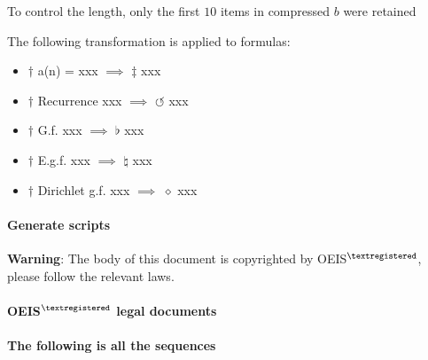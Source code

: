\documentclass{oeiscommon}
\begin{document}
To control the length, only the first \(10\) items in compressed \(b\) were retained

The following transformation is applied to formulas:

\begin{itemize}
    \item \(\dagger\) a(n) = xxx \(\implies\) \(\ddagger\) xxx 
    \item \(\dagger\) Recurrence xxx \(\implies\) \(\circlearrowleft\) xxx 
    \item \(\dagger\) G.f. xxx \(\implies\) \(\flat\) xxx 
    \item \(\dagger\) E.g.f. xxx \(\implies\) \(\natural\) xxx 
    \item \(\dagger\) Dirichlet g.f. xxx \(\implies\) \(\diamond\) xxx 
\end{itemize}

\paragraph{Generate scripts} \href{\repo}{\repo}

\textbf{Warning}: The body of this document is copyrighted by OEIS{\(^{\textregistered}\)}, please follow the relevant laws.

\paragraph{OEIS{\(^{\textregistered}\)} legal documents} \href{\oeislegaldoc}{\oeislegaldoc}

\paragraph{The following is all the sequences}

\newpage
\linespread{1.0}
\twocolumn
\footnotesize
\setcounter{page}{1}
\pagestyle{fancy}
\fancyhf{}
\fancyfoot[LE,RO]{\thepage}



\footnotesize
\setcounter{page}{1}
\pagestyle{fancy}
\fancyhf{}
\fancyfoot[C]{\thepage}
\printindex
\end{document}
